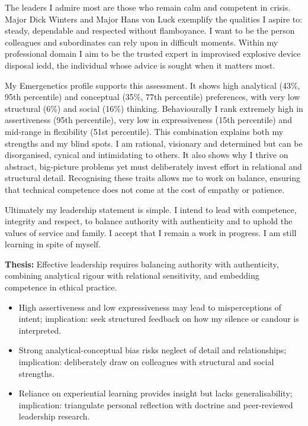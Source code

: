 The leaders I admire most are those who remain calm and competent in crisis. Major Dick Winters and Major Hans von Luck exemplify the qualities I aspire to: steady, dependable and respected without flamboyance. I want to be the person colleagues and subordinates can rely upon in difficult moments. Within my professional domain I aim to be the trusted expert in improvised explosive device disposal \gls{iedd}, the individual whose advice is sought when it matters most.  

My Emergenetics profile supports this assessment. It shows high analytical (43\%, 95th percentile) and conceptual (35\%, 77th percentile) preferences, with very low structural (6\%) and social (16\%) thinking. Behaviourally I rank extremely high in assertiveness (95th percentile), very low in expressiveness (15th percentile) and mid-range in flexibility (51st percentile). This combination explains both my strengths and my blind spots. I am rational, visionary and determined but can be disorganised, cynical and intimidating to others. It also shows why I thrive on abstract, big-picture problems yet must deliberately invest effort in relational and structural detail. Recognising these traits allows me to work on balance, ensuring that technical competence does not come at the cost of empathy or patience.  

Ultimately my leadership statement is simple. I intend to lead with competence, integrity and respect, to balance authority with authenticity and to uphold the values of service and family. I accept that I remain a work in progress. I am still learning in spite of myself.  

\textbf{Thesis:} Effective leadership requires balancing authority with authenticity, combining analytical rigour with relational sensitivity, and embedding competence in ethical practice.  

\begin{itemize}
	\item High assertiveness and low expressiveness may lead to misperceptions of intent; implication: seek structured feedback on how my silence or candour is interpreted.  
	\item Strong analytical-conceptual bias risks neglect of detail and relationships; implication: deliberately draw on colleagues with structural and social strengths.  
	\item Reliance on experiential learning provides insight but lacks generalisability; implication: triangulate personal reflection with doctrine and peer-reviewed leadership research.  
\end{itemize}

